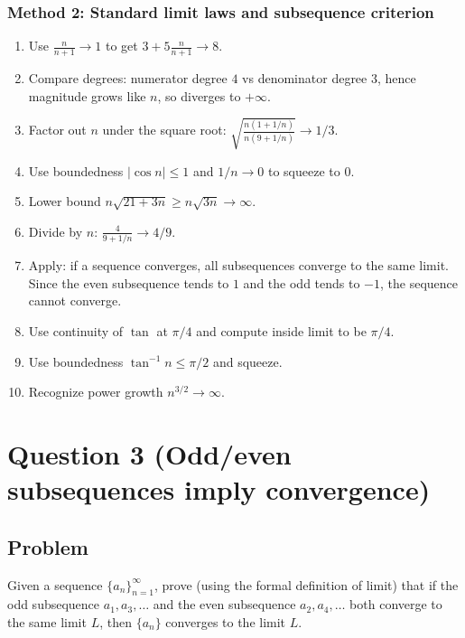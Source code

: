 \documentclass[12pt]{article}
\begin{document}
\subsubsection*{Method 2: Standard limit laws and subsequence criterion}

\begin{enumerate}[label=(\roman*)]
\item Use \(\frac{n}{n+1}\to 1\) to get \(3+5\frac{n}{n+1}\to 8\).

\item Compare degrees: numerator degree \(4\) vs denominator degree \(3\), hence magnitude grows like \(n\), so diverges to \(+\infty\).

\item Factor out \(n\) under the square root: \(\sqrt{\frac{n(1+1/n)}{n(9+1/n)}}\to 1/3\).

\item Use boundedness \(|\cos n|\le 1\) and \(1/n\to 0\) to squeeze to \(0\).

\item Lower bound \(n\sqrt{21+3n}\ge n\sqrt{3n}\to\infty\).

\item Divide by \(n\): \(\frac{4}{9+1/n}\to 4/9\).

\item Apply: if a sequence converges, all subsequences converge to the same limit. Since the even subsequence tends to \(1\) and the odd tends to \(-1\), the sequence cannot converge.

\item Use continuity of \(\tan\) at \(\pi/4\) and compute inside limit to be \(\pi/4\).

\item Use boundedness \(\tan^{-1}n\le \pi/2\) and squeeze.

\item Recognize power growth \(n^{3/2}\to\infty\).
\end{enumerate}

\newpage


\section*{Question 3 (Odd/even subsequences imply convergence)}

\subsection*{Problem}
Given a sequence \(\{a_n\}_{n=1}^{\infty}\), prove (using the formal definition of limit) that if the odd subsequence \(a_1,a_3,\dots\) and the even subsequence \(a_2,a_4,\dots\) both converge to the same limit \(L\), then \(\{a_n\}\) converges to the limit \(L\).
\end{document}
